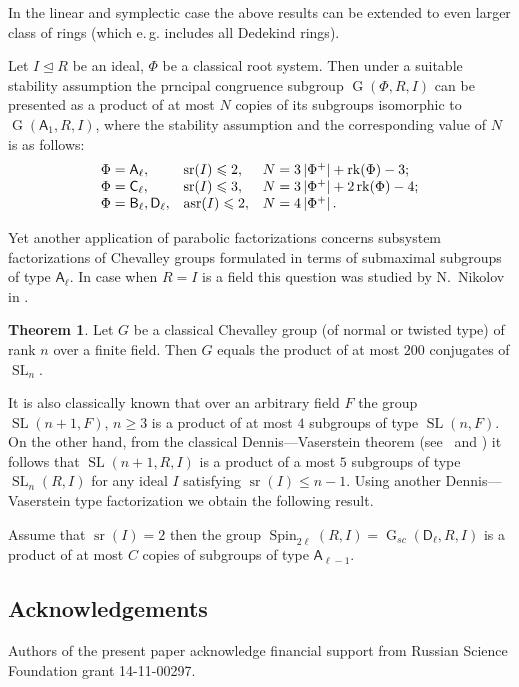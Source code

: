 \documentclass[12pt]{amsart}
\numberwithin{equation}{section}
\theoremstyle{definition}
\newtheorem*{thm*}{Theorem}
\DeclareMathOperator{\G}{G}
\DeclareMathOperator{\SL}{SL}
\DeclareMathOperator{\sr}{sr}
\DeclareMathOperator{\Spin}{Spin}
\DeclareMathOperator{\asr}{asr}
\DeclareMathOperator{\rk}{rk}
\newcommand{\rA}{\mathsf{A}}
\newcommand{\rB}{\mathsf{B}}
\newcommand{\rC}{\mathsf{C}}
\newcommand{\rD}{\mathsf{D}}
\begin{document}
In the linear and symplectic case the above results can be extended to even larger class of rings (which e.\,g. includes all Dedekind rings).
\begin{thm}\label{thm:SL2width}
Let $I\trianglelefteq R$ be an ideal, $\Phi$ be a classical root system. Then under a suitable stability assumption the prncipal congruence subgroup $\G(\Phi,R,I)$ can be presented as a product of at most $N$ copies of its subgroups isomorphic to $\G(\rA_1,R,I)$, where the stability assumption and the corresponding value of $N$ is as follows:
\[\begin{array}{l@{\quad}l@{\quad}l}
\Phi=\rA_\ell, & \sr(I)\leqslant 2, & N=3\left|\Phi^+\right|+\rk(\Phi) - 3; \\
\Phi=\rC_\ell, & \sr(I)\leqslant 3, & N=3\left|\Phi^+\right|+2\rk(\Phi) - 4; \\
\Phi=\rB_\ell,\rD_\ell, & \asr(I)\leqslant 2, & N=4\left|\Phi^+\right|.
\end{array}\]
\end{thm}

Yet another application of parabolic factorizations concerns subsystem factorizations of Chevalley groups formulated in terms of submaximal subgroups of type $\rA_\ell$.
In case when $R=I$ is a field this question was studied by N.~Nikolov in \cite{NikProdDecomp}. 
\begin{thm*} Let $G$ be a classical Chevalley group (of normal or twisted type) of rank $n$ over a finite field.
Then $G$ equals the product of at most $200$ conjugates of $\SL_n$. \end{thm*}

It is also classically known that over an arbitrary field $F$ the group $\SL(n+1, F)$, $n\geq 3$ is a product of at most $4$ subgroups of type $\SL(n, F)$.
On the other hand, from the classical Dennis---Vaserstein theorem (see~\cite{Va69} and \cite[Lemma~2.1]{ST76})
it follows that $\SL(n+1, R, I)$ is a product of a most $5$ subgroups of type $\SL_n(R, I)$ for any ideal $I$ satisfying $\sr(I)\leqslant n-1$.
Using another Dennis---Vaserstein type factorization we obtain the following result.
\begin{thm} Assume that $\sr(I) = 2$ then the group $\Spin_{2\ell}(R, I)=\G_{sc}(\rD_\ell, R, I)$ is a product of at most $C$ copies of subgroups of type $\rA_{\ell-1}$. \end{thm}


\subsection{Acknowledgements}
Authors of the present paper acknowledge financial support from Russian Science Foundation grant 14-11-00297.
\end{document}

